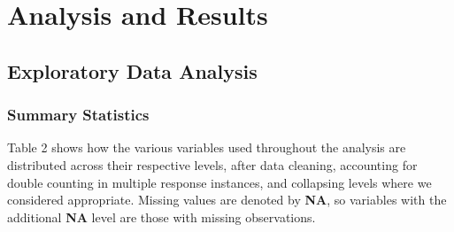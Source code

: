 \documentclass[
  10pt,
]{article}
\begin{document}
\hypertarget{analysis-and-results}{%
\section{Analysis and Results}\label{analysis-and-results}}

\hypertarget{exploratory-data-analysis}{%
\subsection{Exploratory Data Analysis}\label{exploratory-data-analysis}}

\hypertarget{summary-statistics}{%
\subsubsection{Summary Statistics}\label{summary-statistics}}

Table 2 shows how the various variables used throughout the analysis are distributed across their respective levels, after data cleaning, accounting for double counting in multiple response instances, and collapsing levels where we considered appropriate. Missing values are denoted by \textbf{NA}, so variables with the additional \textbf{NA} level are those with missing observations.

\begingroup\fontsize{9}{11}\selectfont
\end{document}
